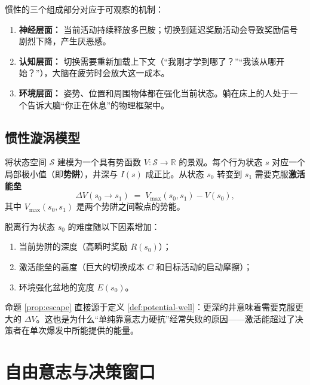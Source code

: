 \begin{remark}
惯性的三个组成部分对应于可观察的机制：
\begin{enumerate}[nosep]
  \item \textbf{神经层面：} 当前活动持续释放多巴胺；切换到延迟奖励活动会导致奖励信号剧烈下降，产生厌恶感。
  \item \textbf{认知层面：} 切换需要重新加载上下文（“我刚才学到哪了？”“我该从哪开始？”），大脑在疲劳时会放大这一成本。
  \item \textbf{环境层面：} 姿势、位置和周围物体都在强化当前状态。躺在床上的人处于一个告诉大脑“你正在休息”的物理框架中。
\end{enumerate}
\end{remark}

\subsection{惯性漩涡模型}

\begin{definition}[势阱模型]\label{def:potential-well}
将状态空间 $\mathcal{S}$ 建模为一个具有势函数 $V : \mathcal{S} \to \mathbb{R}$ 的景观。每个行为状态 $s$ 对应一个局部极小值（即\textbf{势阱}），井深与 $I(s)$ 成正比。从状态 $s_0$ 转变到 $s_1$ 需要克服\textbf{激活能垒}
\[
  \Delta V(s_0 \to s_1) \;=\; V_{\max}(s_0, s_1) - V(s_0),
\]
其中 $V_{\max}(s_0, s_1)$ 是两个势阱之间鞍点的势能。
\end{definition}

\begin{proposition}[脱离难度]\label{prop:escape}
脱离行为状态 $s_0$ 的难度随以下因素增加：
\begin{enumerate}[nosep]
  \item 当前势阱的深度（高瞬时奖励 $R(s_0)$）；
  \item 激活能垒的高度（巨大的切换成本 $C$ 和目标活动的启动摩擦）；
  \item 环境强化盆地的宽度 $E(s_0)$。
\end{enumerate}
\end{proposition}

\begin{discussion}
命题 \ref{prop:escape} 直接源于定义 \ref{def:potential-well}：更深的井意味着需要克服更大的 $\Delta V$。这也是为什么“单纯靠意志力硬抗”经常失败的原因——激活能超过了决策者在单次爆发中所能提供的能量。
\end{discussion}

\section{自由意志与决策窗口}\label{sec:free-will}

